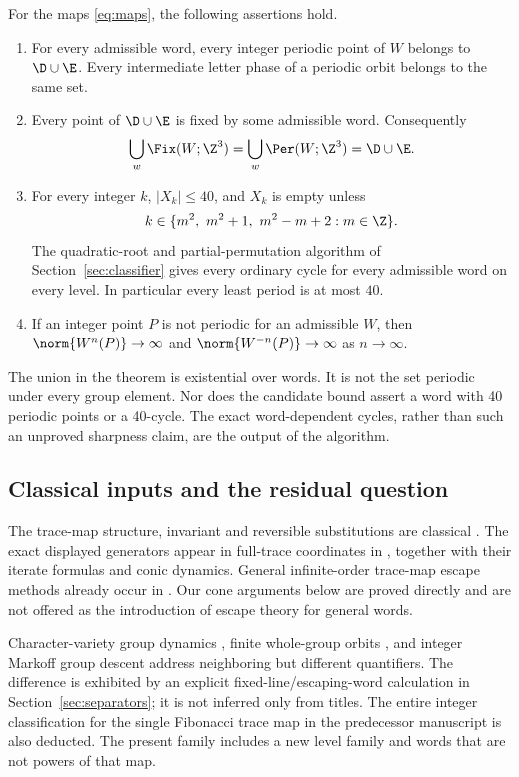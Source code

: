 \begin{theorem}\label{thm:main}
For the maps \eqref{eq:maps}, the following assertions hold.
\begin{enumerate}
\item For every admissible word, every integer periodic point of $W$
belongs to $\D\cup\E$. Every intermediate letter phase of a periodic
orbit belongs to the same set.
\item Every point of $\D\cup\E$ is fixed by some admissible word.
Consequently
\[
 \bigcup_w\Fix(W;\Z^3)=\bigcup_w\Per(W;\Z^3)=\D\cup\E.
\]
\item For every integer $k$, $|X_k|\le40$, and $X_k$ is empty unless
\[
 k\in\{m^2,\ m^2+1,\ m^2-m+2:m\in\Z\}.
\]
The quadratic-root and partial-permutation algorithm of
Section~\ref{sec:classifier} gives every ordinary cycle for every
admissible word on every level. In particular every least period
is at most $40$.
\item If an integer point $P$ is not periodic for an admissible $W$,
then $\norm{W^n(P)}\to\infty$ and $\norm{W^{-n}(P)}\to\infty$
as $n\to\infty$.
\end{enumerate}
\end{theorem}

The union in the theorem is existential over words. It is not the
set periodic under every group element. Nor does the candidate bound
assert a word with 40 periodic points or a 40-cycle. The exact
word-dependent cycles, rather than such an unproved sharpness
claim, are the output of the algorithm.

\subsection{Classical inputs and the residual question}

The trace-map structure, invariant and reversible substitutions are
classical \citep{RobertsBaake1994}. The exact displayed generators
appear in full-trace coordinates in
\citet[Section~2.1]{SasakiYoshida2008}, together with their iterate
formulas and conic dynamics. General infinite-order trace-map escape
methods already occur in \citet{Roberts1996}. Our cone arguments
below are proved directly and are not offered as the introduction
of escape theory for general words.

Character-variety group dynamics \citep{CantatLoray2009},
finite whole-group orbits \citep{Humphries2016}, and integer Markoff
group descent \citep{GhoshSarnak2022} address neighboring but
different quantifiers. The difference is exhibited by an explicit
fixed-line/escaping-word calculation in
Section~\ref{sec:separators}; it is not inferred only from titles.
The entire integer classification for the single Fibonacci trace
map in the predecessor manuscript \citep{C413} is also deducted.
The present family includes a new level family and words that are
not powers of that map.

